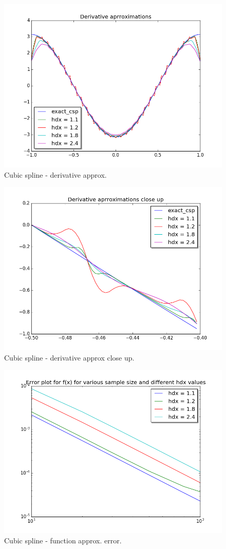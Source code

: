 \documentclass[a4paper,11pt]{article}
\begin{document}
\begin{figure}[ht]
    \centering
    \includegraphics[width=.8\linewidth]{derv_csp.png}
    \caption{Cubic spline - derivative approx.}
    \label{fig:ex2}    
\end{figure}
\begin{figure}[ht]
    \centering
    \includegraphics[width=.8\linewidth]{derv_csp_clup.png}
    \caption{Cubic spline - derivative approx close up.}
    \label{fig:ex3}    
\end{figure}

\begin{figure}[ht]
    \centering
    \includegraphics[width=.8\linewidth]{fun_err_csp.png}
    \caption{Cubic spline - function approx. error.}
    \label{fig:ex4}    
\end{figure}
\end{document}
